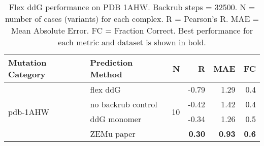 \begin{table}
  \begin{tabular}{llrrrr}
\toprule
Mutation Category &   Prediction Method &   N &     R &  MAE &  FC \\
\midrule
 \multirow{ 4}{*}{pdb-1AHW} & flex ddG & \multirow{ 4}{*}{10} & -0.79 & 1.29 & 0.4  \\
 & no backrub control & & -0.42 & 1.42 & 0.4  \\
 & ddG monomer & & -0.34 & 1.26 & 0.5  \\
 & ZEMu paper & & \textbf{0.30} & \textbf{0.93} & \textbf{0.6}  \\
\bottomrule
\end{tabular}
  \caption[Flex ddG performance on PDB 1AHW]{
    Flex ddG performance on PDB 1AHW. Backrub steps = 32500. N = number of cases (variants) for each complex. R = Pearson's R. MAE = Mean Absolute Error. FC = Fraction Correct. Best performance for each metric and dataset is shown in bold.
  } \label{tab:table-pdb-1AHW}
\end{table}
